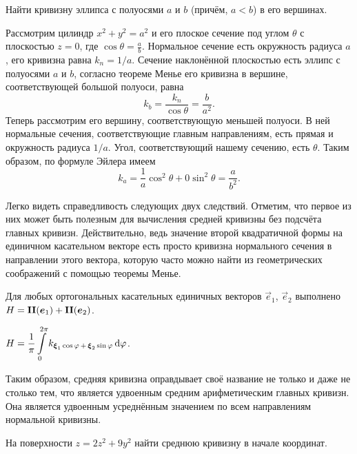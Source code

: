 \begin{problem} \label{problem:EllipseCurvature}
	Найти кривизну эллипса с полуосями $a$ и $b$ (причём, $a < b$) в его вершинах.
\end{problem}

\begin{solution}
	Рассмотрим цилиндр $x^2 + y^2 = a^2$ и его плоское сечение под углом $\theta$ с плоскостью $z = 0$, где $\cos\theta = \frac{a}{b}$. Нормальное сечение есть окружность радиуса $a$, его кривизна равна $k_n = 1 / a$. Сечение наклонённой плоскостью есть эллипс с полуосями $a$ и $b$, согласно теореме Менье его кривизна в вершине, соответствующей большой полуоси, равна
	\[
		k_b = \frac{k_n}{\cos\theta} = \frac{b}{a^2}.
	\]
	Теперь рассмотрим его вершину, соответствующую меньшей полуоси. В ней нормальные сечения, соответствующие главным направлениям, есть прямая и окружность радиуса $1 / a$. Угол, соответствующий нашему сечению, есть $\theta$. Таким образом, по формуле Эйлера имеем
	\[
		k_a = \frac{1}{a}\cos^2\theta + 0\sin^2\theta = \frac{a}{b^2}.
	\]
\end{solution}

Легко видеть справедливость следующих двух следствий. Отметим, что первое из них может быть полезным для вычисления средней кривизны без подсчёта главных кривизн. Действительно, ведь значение второй квадратичной формы на единичном касательном векторе есть просто кривизна нормального сечения в направлении этого вектора, которую часто можно найти из геометрических соображений с помощью теоремы Менье.

\begin{corollary}
	Для любых ортогональных касательных единичных векторов $\vec{e}_1$, $\vec{e}_2$ выполнено $H = \boldsymbol{\operatorname{II}}(\boldsymbol{e}_1) + \boldsymbol{\operatorname{II}}(\boldsymbol{e}_2)$.
\end{corollary}

\begin{corollary}
	$\displaystyle H = \frac{1}{\pi}\int\limits_0^{2\pi}k_{\boldsymbol{\xi}_1\cos\varphi\,+\,\boldsymbol{\xi}_2\sin\varphi}\mathop{}\!\mathrm{d}\varphi$.
\end{corollary}

Таким образом, средняя кривизна оправдывает своё название не только и даже не столько тем, что является удвоенным средним арифметическим главных кривизн. Она является удвоенным усреднённым значением по всем направлениям нормальной кривизны.

\begin{problem}
	На поверхности $z = 2z^2 + 9y^2$ найти среднюю кривизну в начале координат.
\end{problem}

